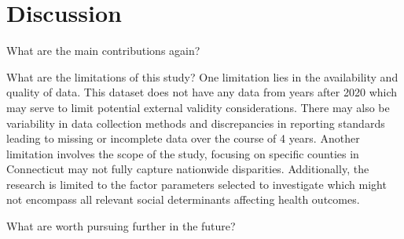 \documentclass[12pt]{article}
\begin{document}
\section{Discussion}\label{sec:disc}

What are the main contributions again?

What are the limitations of this study?
One limitation lies in the availability and quality of data. This dataset does not have any 
data from years after 2020 which may serve to limit potential external validity considerations. 
There may also be variability in data collection methods and discrepancies in reporting standards 
leading to missing or incomplete data over the course of 4 years. Another limitation involves the scope 
of the study, focusing on specific counties in Connecticut may not fully capture nationwide disparities. 
Additionally, the research is limited to the factor parameters selected to investigate which  might not 
encompass all relevant social determinants affecting health outcomes.

What are worth pursuing further in the future?


\appendix



\end{document}
